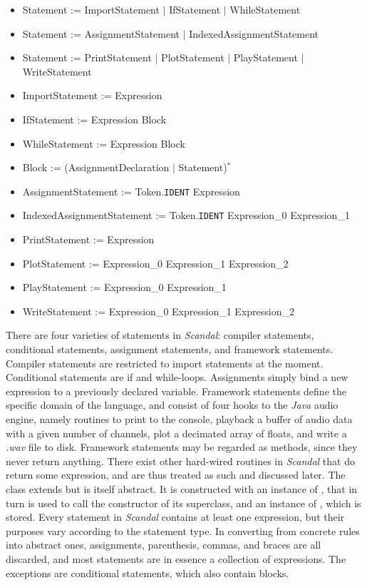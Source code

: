 \begin{itemize}
	\item Statement := ImportStatement $|$ IfStatement $|$ WhileStatement
	\item Statement := AssignmentStatement $|$ IndexedAssignmentStatement
	\item Statement := PrintStatement $|$ PlotStatement $|$ PlayStatement $|$ WriteStatement
	\item ImportStatement := Expression
	\item IfStatement := Expression Block
	\item WhileStatement := Expression Block
	\item Block := (AssignmentDeclaration $|$ Statement)$^*$
	\item AssignmentStatement := Token.\texttt{IDENT} Expression
	\item IndexedAssignmentStatement := Token.\texttt{IDENT} Expression\_0 Expression\_1
	\item PrintStatement := Expression
	\item PlotStatement := Expression\_0 Expression\_1 Expression\_2
	\item PlayStatement := Expression\_0 Expression\_1
	\item WriteStatement := Expression\_0 Expression\_1 Expression\_2
\end{itemize}

There are four varieties of statements in \emph{Scandal}: compiler statements, conditional statements, assignment statements, and framework statements. Compiler statements are restricted to import statements at the moment. Conditional statements are if and while-loops. Assignments simply bind a new expression to a previously declared variable. Framework statements define the specific domain of the language, and consist of four hooks to the \emph{Java} audio engine, namely routines to print to the console, playback a buffer of audio data with a given number of channels, plot a decimated array of floats, and write a \emph{.wav} file to disk. Framework statements may be regarded as  methods, since they never return anything. There exist other hard-wired routines in \emph{Scandal} that do return some expression, and are thus treated as such and discussed later. The  class extends  but is itself abstract. It is constructed with an instance of , that in turn is used to call the constructor of its superclass, and an instance of , which is stored. Every statement in \emph{Scandal} contains at least one expression, but their purposes vary according to the statement type. In converting from concrete rules into abstract ones, assignments, parenthesis, commas, and braces are all discarded, and most statements are in essence a collection of expressions. The exceptions are conditional statements, which also contain blocks.


